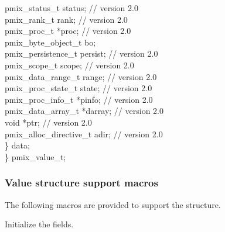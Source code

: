 {\hspace*{8\sigspace}pmix_status_t status;           // version 2.0 \\
\hspace*{8\sigspace}pmix_rank_t rank;               // version 2.0 \\
\hspace*{8\sigspace}pmix_proc_t *proc;              // version 2.0 \\
\hspace*{8\sigspace}pmix_byte_object_t bo; \\
\hspace*{8\sigspace}pmix_persistence_t persist;     // version 2.0 \\
\hspace*{8\sigspace}pmix_scope_t scope;             // version 2.0 \\
\hspace*{8\sigspace}pmix_data_range_t range;        // version 2.0 \\
\hspace*{8\sigspace}pmix_proc_state_t state;        // version 2.0 \\
\hspace*{8\sigspace}pmix_proc_info_t *pinfo;        // version 2.0 \\
\hspace*{8\sigspace}pmix_data_array_t *darray;      // version 2.0 \\
\hspace*{8\sigspace}void *ptr;                      // version 2.0 \\
\hspace*{8\sigspace}pmix_alloc_directive_t adir;    // version 2.0 \\
\hspace*{4\sigspace}\} data; \\
\} pmix_value_t;
}

\subsubsection{Value structure support macros}
The following macros are provided to support the  structure.


Initialize the  fields.


